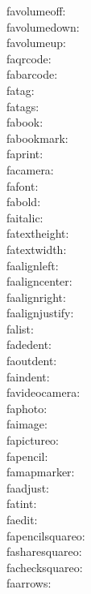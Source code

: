 favolumeoff: {\FA \favolumeoff} \\
favolumedown: {\FA \favolumedown} \\
favolumeup: {\FA \favolumeup} \\
faqrcode: {\FA \faqrcode} \\
fabarcode: {\FA \fabarcode} \\
fatag: {\FA \fatag} \\
fatags: {\FA \fatags} \\
fabook: {\FA \fabook} \\
fabookmark: {\FA \fabookmark} \\
faprint: {\FA \faprint} \\
facamera: {\FA \facamera} \\
fafont: {\FA \fafont} \\
fabold: {\FA \fabold} \\
faitalic: {\FA \faitalic} \\
fatextheight: {\FA \fatextheight} \\
fatextwidth: {\FA \fatextwidth} \\
faalignleft: {\FA \faalignleft} \\
faaligncenter: {\FA \faaligncenter} \\
faalignright: {\FA \faalignright} \\
faalignjustify: {\FA \faalignjustify} \\
falist: {\FA \falist} \\
fadedent: {\FA \fadedent} \\
faoutdent: {\FA \faoutdent} \\
faindent: {\FA \faindent} \\
favideocamera: {\FA \favideocamera} \\
faphoto: {\FA \faphoto} \\
faimage: {\FA \faimage} \\
fapictureo: {\FA \fapictureo} \\
fapencil: {\FA \fapencil} \\
famapmarker: {\FA \famapmarker} \\
faadjust: {\FA \faadjust} \\
fatint: {\FA \fatint} \\
faedit: {\FA \faedit} \\
fapencilsquareo: {\FA \fapencilsquareo} \\
fasharesquareo: {\FA \fasharesquareo} \\
fachecksquareo: {\FA \fachecksquareo} \\
faarrows: {\FA \faarrows} \\
